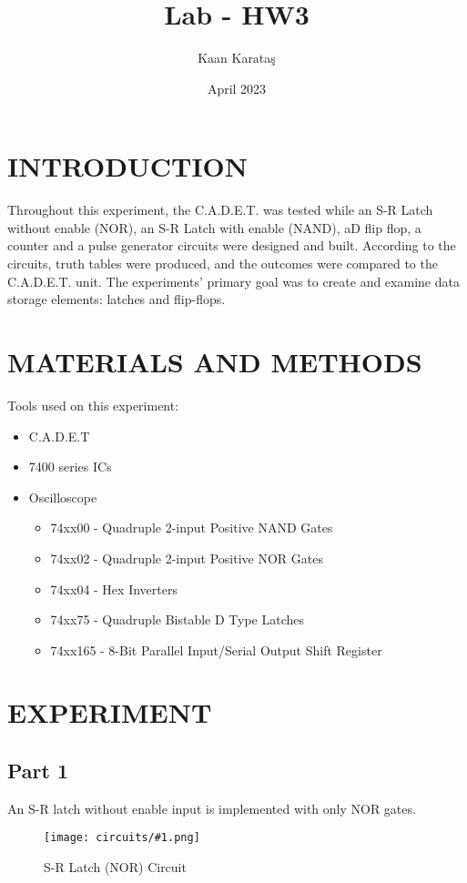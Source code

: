 \documentclass[pdftex,12pt,a4paper]{article}
\title{Lab - HW3}
\author{Kaan Karataş}
\date{April 2023}
\theoremstyle{plain}
\newcommand{\circuit}[1]{
    \begin{figure}[H]
    	\centering
    	\texttt{[image: circuits/\#1.png]}
    	\caption{#1 Circuit}
    	\label{fig7}
    \end{figure}
    \vspace{1cm}
}
\begin{document}


\thispagestyle{empty}


\setcounter{tocdepth}{4}
\tableofcontents
\clearpage
\setcounter{page}{1}
\setcounter{subsubsection}{0}

\section{INTRODUCTION}
Throughout this experiment, the C.A.D.E.T. was tested while an S-R Latch without enable (NOR), an S-R Latch with enable (NAND), aD flip flop, a counter and a pulse generator circuits were designed and built. According to the circuits, truth tables were produced, and the outcomes were compared to the C.A.D.E.T. unit. The experiments’ primary goal was to create and examine data storage elements:
latches and flip-flops.

\section{MATERIALS AND METHODS}
Tools used on this experiment:
\begin{itemize}
    \item C.A.D.E.T
    \item 7400 series ICs
    \item Oscilloscope
    
    \begin{itemize}
        \item 74xx00 - Quadruple 2-input Positive NAND Gates
        \item 74xx02 - Quadruple 2-input Positive NOR Gates
        \item 74xx04 - Hex Inverters
        \item 74xx75 - Quadruple Bistable D Type Latches
        \item 74xx165 - 8-Bit Parallel Input/Serial Output Shift Register
    \end{itemize}
\end{itemize}
\newpage

\newpage
\section{EXPERIMENT}
    \subsection{Part 1}
        An S-R latch without enable input is implemented with only NOR gates.
        \circuit{S-R Latch (NOR)}
        
\end{document}
